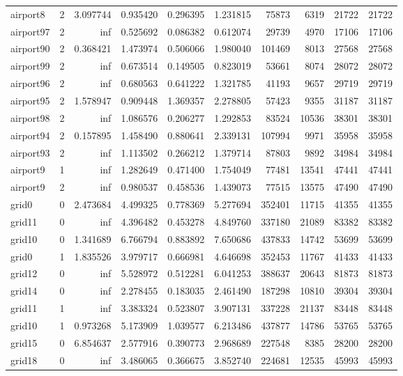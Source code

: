 \begin{longtable}{|l|r|r|r|r|r|r|r|r|r|}
airport8 & 2 & 3.097744 & 0.935420 & 0.296395 & 1.231815 & 75873 & 6319 & 21722 & 21722 \\
airport97 & 2 & inf & 0.525692 & 0.086382 & 0.612074 & 29739 & 4970 & 17106 & 17106 \\
airport90 & 2 & 0.368421 & 1.473974 & 0.506066 & 1.980040 & 101469 & 8013 & 27568 & 27568 \\
airport99 & 2 & inf & 0.673514 & 0.149505 & 0.823019 & 53661 & 8074 & 28072 & 28072 \\
airport96 & 2 & inf & 0.680563 & 0.641222 & 1.321785 & 41193 & 9657 & 29719 & 29719 \\
airport95 & 2 & 1.578947 & 0.909448 & 1.369357 & 2.278805 & 57423 & 9355 & 31187 & 31187 \\
airport98 & 2 & inf & 1.086576 & 0.206277 & 1.292853 & 83524 & 10536 & 38301 & 38301 \\
airport94 & 2 & 0.157895 & 1.458490 & 0.880641 & 2.339131 & 107994 & 9971 & 35958 & 35958 \\
airport93 & 2 & inf & 1.113502 & 0.266212 & 1.379714 & 87803 & 9892 & 34984 & 34984 \\
airport9 & 1 & inf & 1.282649 & 0.471400 & 1.754049 & 77481 & 13541 & 47441 & 47441 \\
airport9 & 2 & inf & 0.980537 & 0.458536 & 1.439073 & 77515 & 13575 & 47490 & 47490 \\
grid0 & 0 & 2.473684 & 4.499325 & 0.778369 & 5.277694 & 352401 & 11715 & 41355 & 41355 \\
grid11 & 0 & inf & 4.396482 & 0.453278 & 4.849760 & 337180 & 21089 & 83382 & 83382 \\
grid10 & 0 & 1.341689 & 6.766794 & 0.883892 & 7.650686 & 437833 & 14742 & 53699 & 53699 \\
grid0 & 1 & 1.835526 & 3.979717 & 0.666981 & 4.646698 & 352453 & 11767 & 41433 & 41433 \\
grid12 & 0 & inf & 5.528972 & 0.512281 & 6.041253 & 388637 & 20643 & 81873 & 81873 \\
grid14 & 0 & inf & 2.278455 & 0.183035 & 2.461490 & 187298 & 10810 & 39304 & 39304 \\
grid11 & 1 & inf & 3.383324 & 0.523807 & 3.907131 & 337228 & 21137 & 83448 & 83448 \\
grid10 & 1 & 0.973268 & 5.173909 & 1.039577 & 6.213486 & 437877 & 14786 & 53765 & 53765 \\
grid15 & 0 & 6.854637 & 2.577916 & 0.390773 & 2.968689 & 227548 & 8385 & 28200 & 28200 \\
grid18 & 0 & inf & 3.486065 & 0.366675 & 3.852740 & 224681 & 12535 & 45993 & 45993 \\

\end{longtable}
